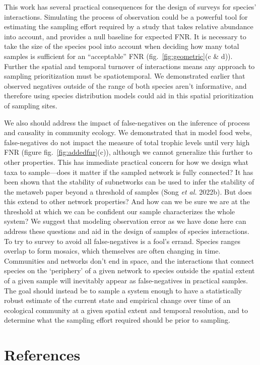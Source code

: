\documentclass[10pt,oneside]{article}
\begin{document}
This work has several practical consequences for the design of surveys
for species' interactions. Simulating the process of observation could
be a powerful tool for estimating the sampling effort required by a
study that takes relative abundance into account, and provides a null
baseline for expected FNR. It is necessary to take the size of the
species pool into account when deciding how many total samples is
sufficient for an ``acceptable'' FNR (fig.~\ref{fig:geometric}(c \& d)).
Further the spatial and temporal turnover of interactions means any
approach to sampling prioritization must be spatiotemporal. We
demonstrated earlier that observed negatives outside of the range of
both species aren't informative, and therefore using species
distribution models could aid in this spatial prioritization of sampling
sites.

We also should address the impact of false-negatives on the inference of
process and causality in community ecology. We demonstrated that in
model food webs, false-negatives do not impact the measure of total
trophic levels until very high FNR (figure fig.~\ref{fig:addedfnr}(c)),
although we cannot generalize this further to other properties. This has
immediate practical concern for how we design what taxa to sample---does
it matter if the sampled network is fully connected? It has been shown
that the stability of subnetworks can be used to infer the stability of
the metaweb paper beyond a threshold of samples (Song \emph{et al.}
2022b). But does this extend to other network properties? And how can we
be sure we are at the threshold at which we can be confident our sample
characterizes the whole system? We suggest that modeling observation
error as we have done here can address these questions and aid in the
design of samples of species interactions. To try to survey to avoid all
false-negatives is a fool's errand. Species ranges overlap to form
mosaics, which themselves are often changing in time. Communities and
networks don't end in space, and the interactions that connect species
on the `periphery' of a given network to species outside the spatial
extent of a given sample will inevitably appear as false-negatives in
practical samples. The goal should instead be to sample a system enough
to have a statistically robust estimate of the current state and
empirical change over time of an ecological community at a given spatial
extent and temporal resolution, and to determine what the sampling
effort required should be prior to sampling.

\hypertarget{references}{%
\section*{References}\label{references}}
\end{document}
